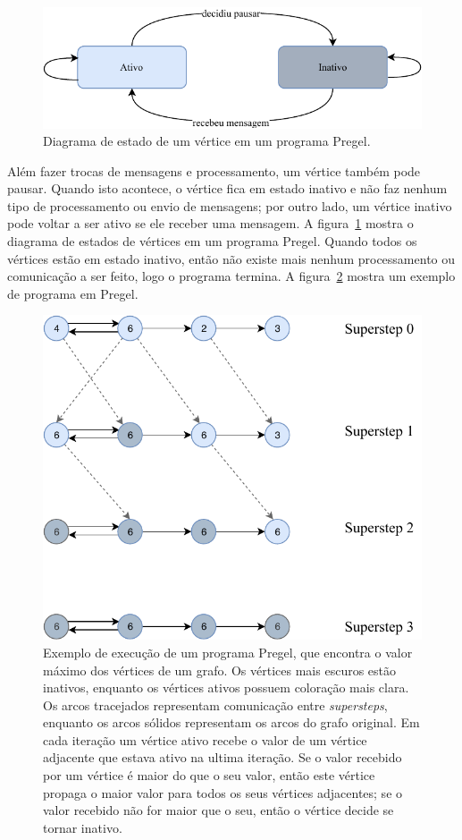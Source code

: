 \documentclass[conference]{IEEEtran}
\begin{document}
\begin{figure}
    \begin{center}
        \includegraphics[width=.45\textwidth]{pregel/vertex_state.pdf}
    \end{center}
    \caption{Diagrama de estado de um vértice em um programa Pregel.}
    \label{fig:pregel_states}
\end{figure}

Além fazer trocas de mensagens e processamento, um vértice também pode
pausar. Quando isto acontece, o vértice fica em estado inativo e não faz
nenhum tipo de processamento ou envio de mensagens; por outro lado, um
vértice inativo pode voltar a ser ativo se ele receber uma mensagem. A
figura~\ref{fig:pregel_states} mostra o diagrama de estados de vértices
em um programa Pregel.  Quando todos os vértices estão em estado
inativo, então não existe mais nenhum processamento ou comunicação a ser
feito, logo o programa termina. A figura~\ref{fig:execution_example}
mostra um exemplo de programa em Pregel.

\begin{figure}
    \begin{center}
        \includegraphics[width=.45\textwidth,
        clip]{pregel/execution_example.pdf}
    \end{center}
    \caption{Exemplo de execução de um programa Pregel, que encontra o
    valor máximo dos vértices de um grafo. Os vértices mais escuros
    estão inativos, enquanto os vértices ativos possuem coloração mais
    clara. Os arcos tracejados representam comunicação entre {\em
    supersteps}, enquanto os arcos sólidos representam os arcos do grafo
    original. Em cada iteração um vértice ativo recebe o valor de um
    vértice adjacente que estava ativo na ultima iteração. Se o valor
    recebido por um vértice é maior do que o seu valor, então este
    vértice propaga o maior valor para todos os seus vértices
    adjacentes; se o valor recebido não for maior que o seu, então o
    vértice decide se tornar inativo.
    }
    \label{fig:execution_example}
\end{figure}
\end{document}
